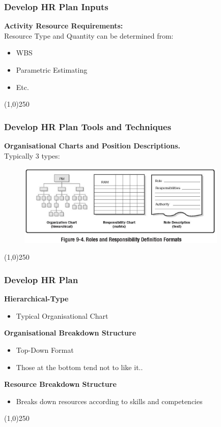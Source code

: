  
\begin{frame}
\frametitle{Develop HR Plan \hfill Inputs}
\textbf{Activity Resource Requirements:}\\
Resource Type and Quantity can be determined from:
\begin{itemize}
	\item WBS
	\item Parametric Estimating
	\item Etc.
\end{itemize}
\end{frame}\begin{center}\line(1,0){250}\end{center}


\begin{frame}
\frametitle{Develop HR Plan \hfill Tools and Techniques}
\textbf{Organisational Charts and Position Descriptions.}\\
Typically 3 types:\\
\begin{figure}
	\centering
		\includegraphics[width = 10cm]{images/Fig9-4.jpg}
	\label{fig:9-4}
\end{figure}
\end{frame}\begin{center}\line(1,0){250}\end{center}


\begin{frame}
\frametitle{Develop HR Plan}
\textbf{Hierarchical-Type}
	\begin{itemize}
		\item Typical Organisational Chart
	\end{itemize}
\textbf{Organisational Breakdown Structure}
	\begin{itemize}
		\item Top-Down Format	
		\item Those at the bottom tend not to like it..
	\end{itemize}
\textbf{Resource Breakdown Structure}	
	\begin{itemize}
		\item Breaks down resources according to skills and competencies
	\end{itemize}
\end{frame}\begin{center}\line(1,0){250}\end{center}
 
